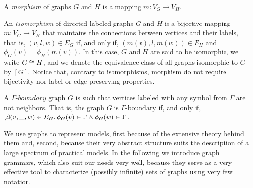 \begin{definition}
	\label{def:morphism}
	A \emph{morphism} of graphs $G$ and $H$ is a mapping $m: V_G \to V_H$.
\end{definition}

\begin{definition}
	An \emph{isomorphism} of directed labeled graphs $G$ and $H$ is a bijective mapping $m: V_G \to V_H$ that maintains the connections between vertices and their labels, that is, $(v,l,w) \in E_G$ if, and only if,  $(m(v),l,m(w)) \in E_H$ and $\phi_G(v) = \phi_H(m(v))$. In this case, $G$ and $H$ are said to be isomorphic, we write $G \isomorph H$, and we denote the equivalence class of all graphs isomorphic to $G$ by $[G]$.
	Notice that, contrary to isomorphisms, morphism do not require bijectivity nor label or edge-preserving properties.
\end{definition}

\begin{definition}
	A $\mathit{\Gamma\textit{-boundary}}$ graph $G$ is such that vertices labeled with any symbol from $\Gamma$ are not neighbors. That is, the graph $G$ is $\Gamma\text{-boundary}$ if, and only if, $\not\exists (v,\_,w) \in E_G \. \phi_G(v) \in \Gamma \land \phi_G(w) \in \Gamma$.
\end{definition}

We use graphs to represent models, first because of the extensive theory behind them and, second, because their very abstract structure suits the description of a large spectrum of practical models. In the following we introduce graph grammars, which also suit our needs very well, because they serve as a very effective tool to characterize (possibly infinite) sets of graphs using very few notation.


